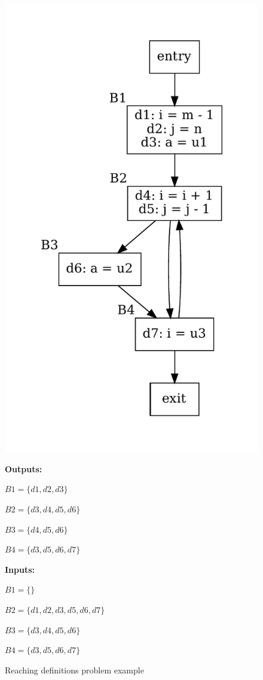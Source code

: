\documentclass{article}
\begin{document}
\begin{figure}[H]
    \centering
    \begin{minipage}{0.45\textwidth}
        \includegraphics[width=\linewidth]{graphs/liveness_reaching.pdf}
    \end{minipage}%
    \begin{minipage}{0.45\textwidth}
        \textbf{Outputs:}
        
        $B1 = \{d1, d2, d3\}$
        
        $B2 = \{d3, d4, d5, d6\}$
        
        $B3 = \{d4, d5, d6\}$
        
        $B4 = \{d3, d5, d6, d7\}$

        \textbf{Inputs:}
        
        $B1 = \{\}$
        
        $B2 = \{d1, d2, d3, d5, d6, d7\}$
        
        $B3 = \{d3, d4, d5, d6\}$
        
        $B4 = \{d3, d5, d6, d7\}$
    \end{minipage}
    \caption{Reaching definitions problem example}
\end{figure}
\end{document}
